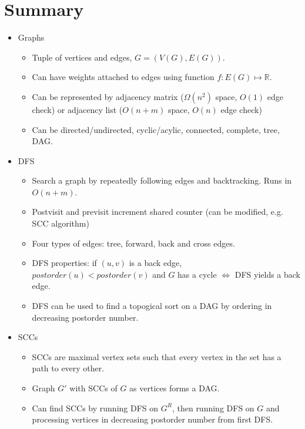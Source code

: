 \documentclass{article}
\begin{document}
\section{Summary}
\begin{summary}
    \begin{itemize}
        \item Graphs
        \begin{itemize}
            \item Tuple of vertices and edges, $G = (V(G), E(G))$.
            \item Can have weights attached to edges using function $f: E(G) \mapsto \mathbb{R}$.
            \item Can be represented by adjacency matrix ($\Omega(n^2)$ space, $O(1)$ edge check) or adjacency list ($O(n + m)$ space, $O(n)$ edge check)
            \item Can be directed/undirected, cyclic/acylic, connected, complete, tree, DAG.
        \end{itemize}
        \item DFS
        \begin{itemize}
            \item Search a graph by repeatedly following edges and backtracking. Runs in $O(n + m)$.
            \item Postvisit and previsit increment shared counter (can be modified, e.g. SCC algorithm)
            \item Four types of edges: tree, forward, back and cross edges.
            \item DFS properties: if $(u, v)$ is a back edge, $postorder(u) < postorder(v)$ and $G$ has a cycle $\iff$ DFS yields a back edge.
            \item DFS can be used to find a topogical sort on a DAG by ordering in decreasing postorder number.
        \end{itemize}
        \item SCCs
        \begin{itemize}
            \item SCCs are maximal vertex sets such that every vertex in the set has a path to every other.
            \item Graph $G'$ with SCCs of $G$ as vertices forms a DAG.
            \item Can find SCCs by running DFS on $G^R$, then running DFS on $G$ and processing vertices in decreasing postorder number from first DFS.
        \end{itemize}
    \end{itemize}
\end{summary}
\end{document}
